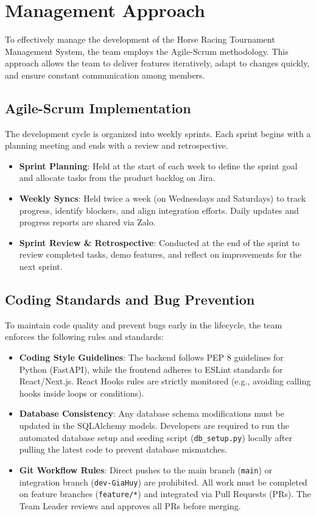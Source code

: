 \section{Management Approach}

To effectively manage the development of the Horse Racing Tournament Management System, the team employs the Agile-Scrum methodology. This approach allows the team to deliver features iteratively, adapt to changes quickly, and ensure constant communication among members.

\subsection{Agile-Scrum Implementation}

The development cycle is organized into weekly sprints. Each sprint begins with a planning meeting and ends with a review and retrospective.
\begin{itemize}
    \item \textbf{Sprint Planning}: Held at the start of each week to define the sprint goal and allocate tasks from the product backlog on Jira.
    \item \textbf{Weekly Syncs}: Held twice a week (on Wednesdays and Saturdays) to track progress, identify blockers, and align integration efforts. Daily updates and progress reports are shared via Zalo.
    \item \textbf{Sprint Review \& Retrospective}: Conducted at the end of the sprint to review completed tasks, demo features, and reflect on improvements for the next sprint.
\end{itemize}

\subsection{Coding Standards and Bug Prevention}

To maintain code quality and prevent bugs early in the lifecycle, the team enforces the following rules and standards:
\begin{itemize}
    \item \textbf{Coding Style Guidelines}: The backend follows PEP 8 guidelines for Python (FastAPI), while the frontend adheres to ESLint standards for React/Next.js. React Hooks rules are strictly monitored (e.g., avoiding calling hooks inside loops or conditions).
    \item \textbf{Database Consistency}: Any database schema modifications must be updated in the SQLAlchemy models. Developers are required to run the automated database setup and seeding script (\texttt{db\_setup.py}) locally after pulling the latest code to prevent database mismatches.
    \item \textbf{Git Workflow Rules}: Direct pushes to the main branch (\texttt{main}) or integration branch (\texttt{dev-GiaHuy}) are prohibited. All work must be completed on feature branches (\texttt{feature/*}) and integrated via Pull Requests (PRs). The Team Leader reviews and approves all PRs before merging.
\end{itemize}
